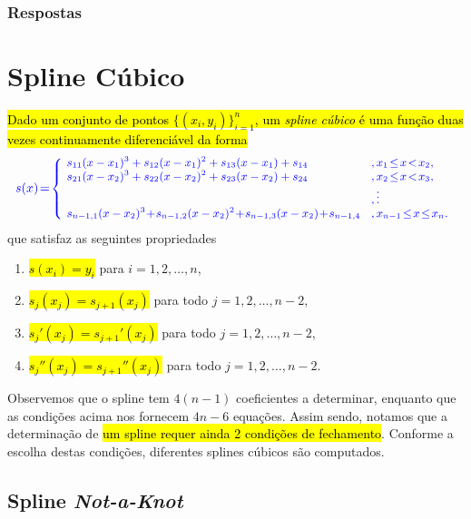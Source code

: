 \subsubsection{Respostas}
\shipoutAnswer
\fi


\section{Spline Cúbico}\label{cap_interp_sec_splines}

\hl{Dado um conjunto de pontos $\{(x_i,y_i)\}_{i=1}^n$, um \emph{spline cúbico} é uma função duas vezes continuamente diferenciável da forma}
\begin{equation}\hleq
  \begin{small}
    s(x)\!=\!\left\{
      \begin{array}{ll}
        \!s_{11}(x-x_1)^3 + s_{12}(x-x_1)^2 + s_{13}(x-x_1) + s_{14} &,x_1\!\leq\!x\!<\!x_2,\\
        \!s_{21}(x-x_2)^3 + s_{22}(x-x_2)^2 + s_{23}(x-x_2) + s_{24} &,x_2\!\leq\!x\!<\!x_3,\\
                                                                   &, \vdots \\
        \!s_{n-1,1}(x-x_2)^3\!+\!s_{n-1,2}(x-x_2)^2\!+\!s_{n-1,3}(x-x_2)\!+\!s_{n-1,4}\!&,x_{n-1}\!\leq\!x\!\leq\!x_n.
      \end{array}
    \right.
  \end{small}
\end{equation}
que satisfaz as seguintes propriedades
\begin{enumerate}
\item \hl{$s(x_i) = y_i$} para $i=1, 2, \dotsc, n$,
\item \hl{$s_j(x_j) = s_{j+1}(x_j)$} para todo $j = 1, 2, \dotsc, n-2$,
\item \hl{$s_j'(x_j) = s_{j+1}'(x_j)$} para todo $j = 1, 2, \dotsc, n-2$,  
\item \hl{$s_j''(x_j) = s_{j+1}''(x_j)$} para todo $j= 1, 2, \dotsc, n-2$.
\end{enumerate}

Observemos que o spline tem $4(n-1)$ coeficientes a determinar, enquanto que as condições acima nos fornecem $4n-6$ equações. Assim sendo, notamos que a determinação de \hl{um spline requer ainda 2 condições de fechamento}. Conforme a escolha destas condições, diferentes splines cúbicos são computados.

\subsection{Spline {\it Not-a-Knot}}

